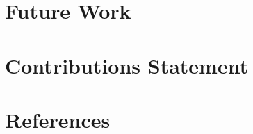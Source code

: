 \documentclass{article}
\begin{document}
\section{Future Work}

\section{Contributions Statement}



\section*{References}
\end{document}
